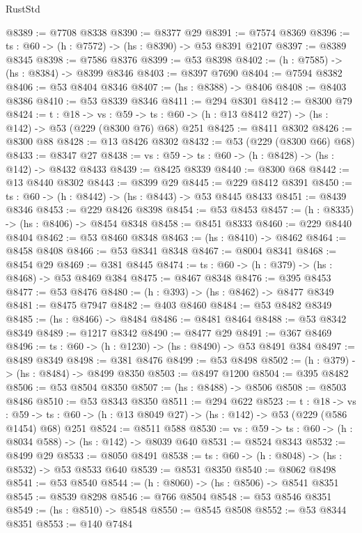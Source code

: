 \begin{lexlean}{RustStd}
\begin{coremodule}
@8389 := @7708 @8338
@8390 := @8377 @29
@8391 := @7574 @8369
@8396 := {ts : @60} -> (h : @7572) -> (hs : @8390) -> @53 @8391 @2107
@8397 := @8389 @8345
@8398 := @7586 @8376
@8399 := @53 @8398
@8402 := (h : @7585) -> (hs : @8384) -> @8399 @8346
@8403 := @8397 @7690
@8404 := @7594 @8382
@8406 := @53 @8404 @8346
@8407 := (hs : @8388) -> @8406
@8408 := @8403 @8386
@8410 := @53 @8339 @8346
@8411 := @294 @8301
@8412 := @8300 @79
@8424 := {t : @18} ->
  {vs : @59} -> {ts : @60} -> (h : @13 @8412 @27) -> (hs : @142) -> @53 (@229 (@8300 @76) @68) @251
@8425 := @8411 @8302
@8426 := @8300 @88
@8428 := @13 @8426 @8302
@8432 := @53 (@229 (@8300 @66) @68)
@8433 := @8347 @27
@8438 := {vs : @59} -> {ts : @60} -> (h : @8428) -> (hs : @142) -> @8432 @8433
@8439 := @8425 @8339
@8440 := @8300 @68
@8442 := @13 @8440 @8302
@8443 := @8399 @29
@8445 := @229 @8412 @8391
@8450 := {ts : @60} -> (h : @8442) -> (hs : @8443) -> @53 @8445 @8433
@8451 := @8439 @8346
@8453 := @229 @8426 @8398
@8454 := @53 @8453
@8457 := (h : @8335) -> (hs : @8406) -> @8454 @8348
@8458 := @8451 @8333
@8460 := @229 @8440 @8404
@8462 := @53 @8460 @8348
@8463 := (hs : @8410) -> @8462
@8464 := @8458 @8408
@8466 := @53 @8341 @8348
@8467 := @8004 @8341
@8468 := @8454 @29
@8469 := @381 @8445
@8474 := {ts : @60} -> (h : @379) -> (hs : @8468) -> @53 @8469 @384
@8475 := @8467 @8348
@8476 := @395 @8453
@8477 := @53 @8476
@8480 := (h : @393) -> (hs : @8462) -> @8477 @8349
@8481 := @8475 @7947
@8482 := @403 @8460
@8484 := @53 @8482 @8349
@8485 := (hs : @8466) -> @8484
@8486 := @8481 @8464
@8488 := @53 @8342 @8349
@8489 := @1217 @8342
@8490 := @8477 @29
@8491 := @367 @8469
@8496 := {ts : @60} -> (h : @1230) -> (hs : @8490) -> @53 @8491 @384
@8497 := @8489 @8349
@8498 := @381 @8476
@8499 := @53 @8498
@8502 := (h : @379) -> (hs : @8484) -> @8499 @8350
@8503 := @8497 @1200
@8504 := @395 @8482
@8506 := @53 @8504 @8350
@8507 := (hs : @8488) -> @8506
@8508 := @8503 @8486
@8510 := @53 @8343 @8350
@8511 := @294 @622
@8523 := {t : @18} ->
  {vs : @59} -> {ts : @60} -> (h : @13 @8049 @27) -> (hs : @142) -> @53 (@229 (@586 @1454) @68) @251
@8524 := @8511 @588
@8530 := {vs : @59} -> {ts : @60} -> (h : @8034 @588) -> (hs : @142) -> @8039 @640
@8531 := @8524 @8343
@8532 := @8499 @29
@8533 := @8050 @8491
@8538 := {ts : @60} -> (h : @8048) -> (hs : @8532) -> @53 @8533 @640
@8539 := @8531 @8350
@8540 := @8062 @8498
@8541 := @53 @8540
@8544 := (h : @8060) -> (hs : @8506) -> @8541 @8351
@8545 := @8539 @8298
@8546 := @766 @8504
@8548 := @53 @8546 @8351
@8549 := (hs : @8510) -> @8548
@8550 := @8545 @8508
@8552 := @53 @8344 @8351
@8553 := @140 @7484

\end{coremodule}
\end{lexlean}
